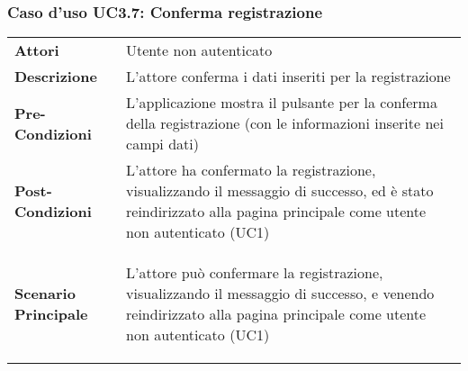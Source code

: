 \subsubsection{Caso d'uso UC3.7: Conferma registrazione}
\label{UC3_7}

\begin{longtable}{ l | p{11cm}}
	\hline
	\rowcolor{Gray}
	 \multicolumn{2}{c}{UC3.7 - Conferma registrazione} \\
	 \hline
	\textbf{Attori} & Utente non autenticato \\
	\textbf{Descrizione} & L'attore conferma i dati inseriti per la registrazione \\
	\textbf{Pre-Condizioni} & L'applicazione mostra il pulsante per la conferma della registrazione (con le informazioni inserite nei campi dati) \\
	\textbf{Post-Condizioni} & L'attore ha confermato la registrazione, visualizzando il messaggio di successo, ed è stato reindirizzato alla pagina principale come utente non autenticato (UC1) \\
	\textbf{Scenario Principale} & \begin{enumerate*}[label=(\arabic*.),itemjoin={\newline}]
		\item L'attore può confermare la registrazione, visualizzando il messaggio di successo, e venendo reindirizzato alla pagina principale come utente non autenticato (UC1)
	\end{enumerate*}\\
\end{longtable}